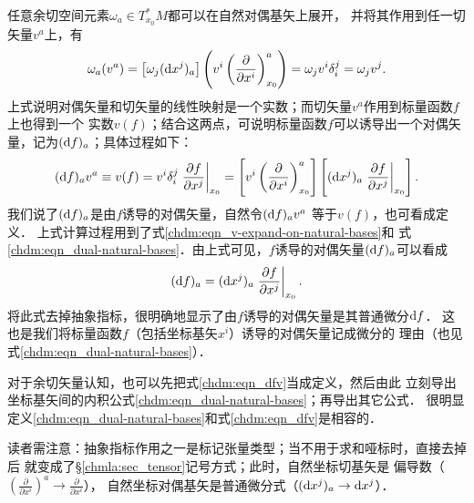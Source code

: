 任意余切空间元素$\omega_a \in T_{x_0}^{*}M$都可以在自然对偶基矢上展开，
并将其作用到任一切矢量$v^a$上，有
\begin{equation}
    \omega_a (v^a) = \left[\omega_j({\rm d}x^j)_a\right] 
      \left(v^i \left(\frac{\partial }{\partial x^i}\right)^a_{x_0}\right) = 
     \omega_j v^i \delta^j_i = \omega_j v^j .
\end{equation}
上式说明对偶矢量和切矢量的线性映射是一个实数；而切矢量$v^a$作用到标量函数$f$上也得到一个
实数$v(f)$；结合这两点，可说明标量函数$f$可以诱导出一个对偶矢量，记为$({\rm d}f)_a$；具体过程如下：
\begin{equation}\label{chdm:eqn_dfv}
    ({\rm d}f)_a v^a \equiv v(f)  %
    = v^i  \delta_i^j  \left.\frac{\partial f}{\partial x^j}\right|_{x_0}
    = \left[v^i  \left(\frac{\partial }{\partial x^i}\right)^a_{x_0}\right] \left[
      ({\rm d}x^j)_a  \left.\frac{\partial f}{\partial x^j}\right|_{x_0} \right] .
\end{equation}
我们说了$({\rm d}f)_a$是由$f$诱导的对偶矢量，自然令$({\rm d}f)_a v^a$ 等于$v(f)$，也可看成定义．
上式计算过程用到了式\eqref{chdm:eqn_v-expand-on-natural-bases}和
式\eqref{chdm:eqn_dual-natural-bases}．由上式可见，$f$诱导的对偶矢量$({\rm d}f)_a$可以看成
\begin{equation}\label{chdm:eqn_df}
    ({\rm d}f)_a = ({\rm d}x^j)_a \left.\frac{\partial f}{\partial x^j}\right|_{x_0} .
\end{equation}
将此式去掉抽象指标，很明确地显示了由$f$诱导的对偶矢量是其普通{\heiti 微分}${\rm d}f$．
这也是我们将标量函数$f$（包括坐标基矢$x^i$）诱导的对偶矢量记成微分的
理由（也见式\eqref{chdm:eqn_dual-natural-bases}）．

对于余切矢量认知，也可以先把式\eqref{chdm:eqn_dfv}当成定义，然后由此
立刻导出坐标基矢间的内积公式\eqref{chdm:eqn_dual-natural-bases}；再导出其它公式．
很明显定义\eqref{chdm:eqn_dual-natural-bases}和式\eqref{chdm:eqn_dfv}是相容的．


\begin{remark}
读者需注意：抽象指标作用之一是标记张量类型；当不用于求和哑标时，直接去掉后
就变成了\S\ref{chmla:sec_tensor}记号方式；此时，自然坐标切基矢是
偏导数（$(\frac{\partial }{\partial x^i})^a\to \frac{\partial }{\partial x^i}$），
自然坐标对偶基矢是普通微分式（$({\rm d}x^j)_a \to {\rm d}x^j$）．
\end{remark}

